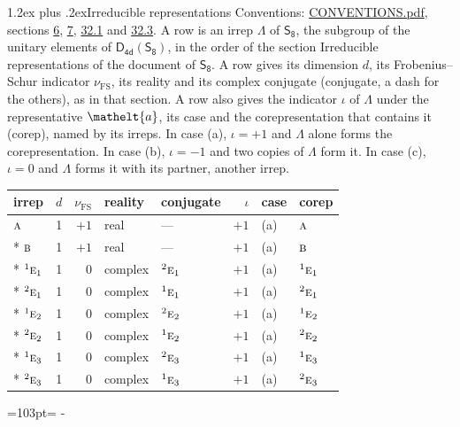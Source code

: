 \documentclass[10pt,a4paper]{article}
\makeatletter
\renewcommand\section{\@startsection{section}{1}{\z@}{-3ex plus -1ex minus -.2ex}%
  {1.2ex plus .2ex}{\normalfont\large\sffamily\bfseries\color{parttitle}}}
\newcommand{\needspace}[1]{\par\penalty-100\begingroup\dimen0=#1\relax\dimen2=\pagegoal
  \advance\dimen2-\pagetotal\ifdim\dimen0>\dimen2\relax\ifdim\dimen2>0pt\vfil\break\fi\fi
  \endgroup}
\numberwithin{equation}{section}
\newcommand{\eltfont}[1]{{\let\sigma\eltsigma\mathelt{#1}}}
\newcommand{\grp}[1]{\mathsf{#1}}
\newcommand{\irr}[1]{\text{\normalfont\scshape #1}}
\newcommand{\conjpair}[1]{{}^{#1}}
\newcommand{\elt}[1]{\eltfont{#1}}
\newcommand{\fsind}{\nu_{\mathrm{FS}}}
\makeatother
\begin{document}
\section{Irreducible representations}\label{s:irreps}
Conventions: \href{../../CONVENTIONS.pdf}{CONVENTIONS.pdf}, sections \href{../../../rotation/CONVENTIONS.pdf\#conv.6}{6}, \href{../../../rotation/CONVENTIONS.pdf\#conv.7}{7}, \href{../../CONVENTIONS.pdf\#conv.32.1}{32.1} and \href{../../CONVENTIONS.pdf\#conv.32.3}{32.3}.
\leavevmode\label{n:irrep.Delta}A row is an irrep $\Lambda$ of $\grp{S_{8}}$, the subgroup of the unitary elements of $\grp{D_{4d}}(\grp{S_{8}})$, in the order of the section Irreducible representations of the document of \href{../../../rotation/data/pdf/S8.pdf}{$\grp{S_{8}}$}. \label{n:index.dimension}\label{n:index.frobenius}\label{n:head.irrep}\label{n:head.reality}\label{n:head.conjugate}A row gives its dimension $d$, its Frobenius--Schur indicator $\fsind$, its reality and its complex conjugate (conjugate, a dash for the others), as in that section. \label{n:head.case.corep}\label{n:head.corep}A row also gives the indicator $\iota$ of $\Lambda$ under the representative $\elt{a}$, its case and the corepresentation that contains it (corep), named by its irreps. In case (a), $\iota = +1$ and $\Lambda$ alone forms the corepresentation. In case (b), $\iota = -1$ and two copies of $\Lambda$ form it. In case (c), $\iota = 0$ and $\Lambda$ forms it with its partner, another irrep.
\setlength{\emergencystretch}{2em}\par\setlength{\emergencystretch}{0pt}
{\small\renewcommand{\arraystretch}{1.25}\setlength{\tabcolsep}{4pt}\begin{longtable}{@{}lrrllrll@{}}\toprule
irrep & $d$ & $\fsind$ & reality & conjugate & $\iota$ & case & corep\\\midrule\endhead
\bottomrule\endfoot\endlastfoot
$\irr{a}$ & 1 & $+1$ & real & --- & $+1$ & (a) & $\irr{a}$\\*
$\irr{b}$ & 1 & $+1$ & real & --- & $+1$ & (a) & $\irr{b}$\\*
$\conjpair{1}\irr{e}_{1}$ & 1 & $0$ & complex & $\conjpair{2}\irr{e}_{1}$ & $+1$ & (a) & $\conjpair{1}\irr{e}_{1}$\\*
$\conjpair{2}\irr{e}_{1}$ & 1 & $0$ & complex & $\conjpair{1}\irr{e}_{1}$ & $+1$ & (a) & $\conjpair{2}\irr{e}_{1}$\\*
$\conjpair{1}\irr{e}_{2}$ & 1 & $0$ & complex & $\conjpair{2}\irr{e}_{2}$ & $+1$ & (a) & $\conjpair{1}\irr{e}_{2}$\\*
$\conjpair{2}\irr{e}_{2}$ & 1 & $0$ & complex & $\conjpair{1}\irr{e}_{2}$ & $+1$ & (a) & $\conjpair{2}\irr{e}_{2}$\\*
$\conjpair{1}\irr{e}_{3}$ & 1 & $0$ & complex & $\conjpair{2}\irr{e}_{3}$ & $+1$ & (a) & $\conjpair{1}\irr{e}_{3}$\\*
$\conjpair{2}\irr{e}_{3}$ & 1 & $0$ & complex & $\conjpair{1}\irr{e}_{3}$ & $+1$ & (a) & $\conjpair{2}\irr{e}_{3}$\\
\bottomrule\end{longtable}}
\needspace{103pt}
\end{document}
